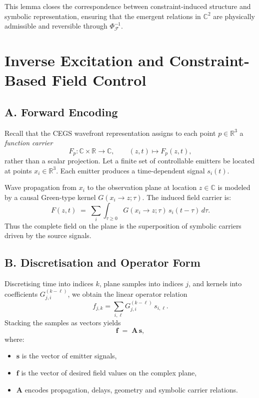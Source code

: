 \documentclass[11pt]{article}
\theoremstyle{plain}
\theoremstyle{definition}
\theoremstyle{remark}
\begin{document}
This lemma closes the correspondence between constraint-induced structure and
symbolic representation, ensuring that the emergent relations in $\mathbb{C}^2$
are physically admissible and reversible through $\Phi_{\mathcal{F}}^{-1}$.

\section*{Inverse Excitation and Constraint-Based Field Control}

\subsection*{A. Forward Encoding}
Recall that the CEGS wavefront representation assigns to each point \(p \in \mathbb{R}^3\) 
a \emph{function carrier}
\[
F_p : \mathbb{C} \times \mathbb{R} \to \mathbb{C}, \qquad (z,t) \mapsto F_p(z,t),
\]
rather than a scalar projection.  
Let a finite set of controllable emitters be located at points \(x_i \in \mathbb{R}^3\).
Each emitter produces a time-dependent signal \(s_i(t)\).

Wave propagation from \(x_i\) to the observation plane at location \(z \in \mathbb{C}\)
is modeled by a causal Green-type kernel \(G(x_i \to z;\tau)\).  
The induced field carrier is:
\[
F(z,t) \;=\; \sum_{i} \int_{\tau \ge 0} G(x_i \to z;\tau)\, s_i(t-\tau)\, d\tau.
\]
Thus the complete field on the plane is the superposition of symbolic carriers driven by the
source signals.

\subsection*{B. Discretisation and Operator Form}
Discretising time into indices \(k\), plane samples into indices \(j\), and kernels into 
coefficients \(G_{j,i}^{(k-\ell)}\), we obtain the linear operator relation
\[
f_{j,k} = \sum_{i,\ell} G_{j,i}^{(k-\ell)} \, s_{i,\ell}.
\]
Stacking the samples as vectors yields
\[
\mathbf{f} \;=\; \mathbf{A}\,\mathbf{s},
\]
where:
\begin{itemize}[leftmargin=*]
\item \(\mathbf{s}\) is the vector of emitter signals,
\item \(\mathbf{f}\) is the vector of desired field values on the complex plane,
\item \(\mathbf{A}\) encodes propagation, delays, geometry and symbolic carrier relations.
\end{itemize}
\end{document}
